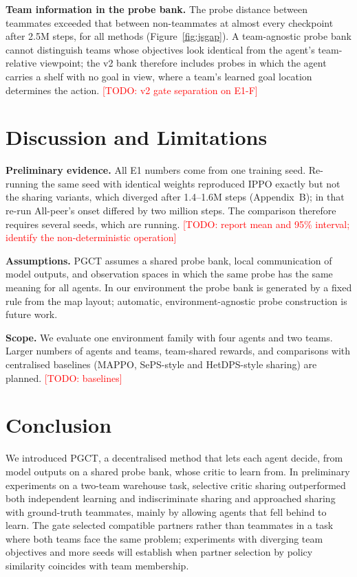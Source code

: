 \documentclass{article}
\newcommand{\todo}[1]{\textcolor{red}{[TODO: #1]}}
\newcommand{\ours}{PGCT}
\begin{document}
\textbf{Team information in the probe bank.} The probe distance between teammates exceeded that between
non-teammates at almost every checkpoint after 2.5M steps, for all methods (Figure~\ref{fig:jsgap}). A team-agnostic
probe bank cannot distinguish teams whose objectives look identical from the agent's team-relative viewpoint; the
v2 bank therefore includes probes in which the agent carries a shelf with no goal in view, where a team's learned
goal location determines the action. \todo{v2 gate separation on E1-F}

\section{Discussion and Limitations}
\textbf{Preliminary evidence.} All E1 numbers come from one training seed. Re-running the same seed with identical
weights reproduced IPPO exactly but not the sharing variants, which diverged after 1.4--1.6M steps (Appendix~B);
in that re-run All-peer's onset differed by two million steps. The comparison therefore requires several seeds, which
are running. \todo{report mean and 95\% interval; identify the non-deterministic operation}

\textbf{Assumptions.} \ours{} assumes a shared probe bank, local communication of model outputs, and observation
spaces in which the same probe has the same meaning for all agents. In our environment the probe bank is generated
by a fixed rule from the map layout; automatic, environment-agnostic probe construction is future work.

\textbf{Scope.} We evaluate one environment family with four agents and two teams. Larger numbers of agents and
teams, team-shared rewards, and comparisons with centralised baselines (MAPPO, SePS-style and HetDPS-style sharing)
are planned. \todo{baselines}

\section{Conclusion}
We introduced \ours{}, a decentralised method that lets each agent decide, from model outputs on a shared probe bank,
whose critic to learn from. In preliminary experiments on a two-team warehouse task, selective critic sharing
outperformed both independent learning and indiscriminate sharing and approached sharing with ground-truth
teammates, mainly by allowing agents that fell behind to learn. The gate selected compatible partners rather than
teammates in a task where both teams face the same problem; experiments with diverging team objectives and more seeds
will establish when partner selection by policy similarity coincides with team membership.
\end{document}
